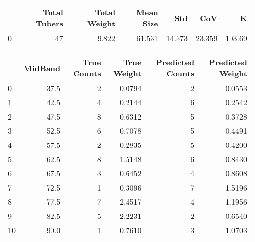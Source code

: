\begin{tabular}{lrrrrrr}
\toprule
{} &  Total Tubers &  Total Weight &  Mean Size &     Std &     CoV &       K \\
\midrule
0 &            47 &         9.822 &     61.531 &  14.373 &  23.359 &  103.69 \\
\bottomrule
\end{tabular}

\begin{tabular}{lrrrrr}
\toprule
{} &  MidBand &  True Counts &  True Weight &  Predicted Counts &  Predicted Weight \\
\midrule
0  &     37.5 &            2 &       0.0794 &                 2 &            0.0553 \\
1  &     42.5 &            4 &       0.2144 &                 6 &            0.2542 \\
2  &     47.5 &            8 &       0.6312 &                 5 &            0.3728 \\
3  &     52.5 &            6 &       0.7078 &                 5 &            0.4491 \\
4  &     57.5 &            2 &       0.2835 &                 5 &            0.4200 \\
5  &     62.5 &            8 &       1.5148 &                 6 &            0.8430 \\
6  &     67.5 &            3 &       0.6452 &                 4 &            0.8608 \\
7  &     72.5 &            1 &       0.3096 &                 7 &            1.5196 \\
8  &     77.5 &            7 &       2.4517 &                 4 &            1.1956 \\
9  &     82.5 &            5 &       2.2231 &                 2 &            0.6540 \\
10 &     90.0 &            1 &       0.7610 &                 3 &            1.0703 \\
\bottomrule
\end{tabular}

